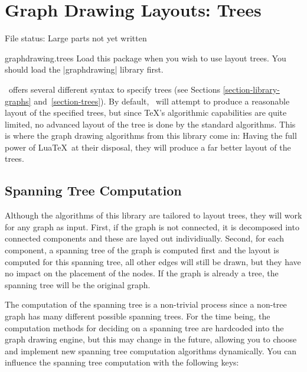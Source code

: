 %
%
%

\section{Graph Drawing Layouts: Trees}
\label{section-first-graphdrawing-library-in-manual}
\label{section-library-graphdrawing-trees}

{}

File status: Large parts not yet written

\begin{tikzlibrary}{graphdrawing.trees}
  Load this package when you wish to use layout trees. You should load
  the |graphdrawing| library first. 
\end{tikzlibrary}


\tikzname\ offers several different syntax to specify trees (see
Sections \ref{section-library-graphs} and~\ref{section-trees}). By
default, \tikzname\ will attempt to produce a reasonable layout of the
specified trees, but since \TeX's algorithmic capabilities are quite
limited, no advanced layout of the tree is done by the standard
algorithms. This is where the graph drawing algorithms from this
library come in: Having the full power of Lua\TeX\ at their disposal,
they will produce a far better layout of the trees.



\subsection{Spanning Tree Computation}

Although the algorithms of this library are tailored to layout trees,
they will work for any graph as input. First, if the graph is not
connected, it is decomposed into connected components and these are
layed out individiually. Second, for each component, a spanning tree of
the graph is computed first and the layout is computed for this
spanning tree, all other edges will still be drawn, but they have no
impact on the placement of the nodes. If the graph is already a tree,
the spanning tree will be the original graph.

The computation of the spanning tree is a non-trivial process since
a non-tree graph has many different possible spanning trees. For the
time being, the computation methods for deciding on a spanning tree
are hardcoded into the graph drawing engine, but this may change in
the future, allowing you to choose and implement new spanning tree
computation algorithms dynamically.  You can
influence the spanning tree computation with the following keys:

